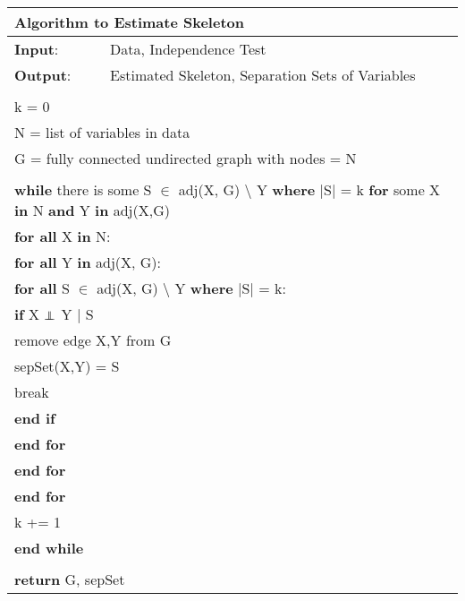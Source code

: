 \documentclass{article}
\newcommand\independent{\protect\mathpalette{\protect\independenT}{\perp}}
\def\independenT#1#2{\mathrel{\rlap{$#1#2$}\mkern2mu{#1#2}}}
\begin{document}
\begin{table}[h!]
	\begin{tabular}{|l l|}
		\hline
		\multicolumn{2}{|l|}{Algorithm to Estimate Skeleton}\\ 
		\hline
		\textbf{Input}: & Data, Independence Test\\
		\textbf{Output}: & Estimated Skeleton, Separation Sets of Variables\\
		&\\
		\multicolumn{2}{|l|}{k = 0}\\
		\multicolumn{2}{|l|}{N = list of variables in data}\\
		\multicolumn{2}{|l|}{G = fully connected undirected graph with nodes = N}\\
		&\\
		\multicolumn{2}{|l|}{\textbf{while} there is some S $\in $ adj(X, G) $\setminus$ Y \textbf{where} $ | $S$ | $ = k \textbf{for} some X \textbf{in} N \textbf{and} Y \textbf{in} adj(X,G)}\\
		\multicolumn{2}{|l|}{\quad\textbf{for all} X \textbf{in} N:}\\
		\multicolumn{2}{|l|}{\quad\quad \textbf{for all} Y \textbf{in} adj(X, G):}\\
		\multicolumn{2}{|l|}{\quad\quad\quad \textbf{for all} S $\in $ adj(X, G) $\setminus$ Y \textbf{where} $ | $S$ | $ = k:}\\
		\multicolumn{2}{|l|}{\quad \quad \quad\quad \textbf{if} X $ \independent $ Y $ | $ S}\\
		\multicolumn{2}{|l|}{\quad \quad \quad \quad\quad remove edge X,Y from G}\\
		\multicolumn{2}{|l|}{\quad \quad \quad \quad\quad sepSet(X,Y) = S}\\
		\multicolumn{2}{|l|}{\quad \quad \quad \quad\quad break}\\
		\multicolumn{2}{|l|}{\quad \quad \quad\quad \textbf{end if}} \\
		\multicolumn{2}{|l|}{\quad \quad\quad \textbf{end for}}\\
		\multicolumn{2}{|l|}{\quad\quad \textbf{end for}}\\
		\multicolumn{2}{|l|}{\quad\textbf{end for}}\\
		\multicolumn{2}{|l|}{\quad k += 1}\\
		\multicolumn{2}{|l|}{ \textbf{end while}}\\
		&\\
		\multicolumn{2}{|l|}{ \textbf{return} G, sepSet}\\
		\hline
		
	\end{tabular}
\end{table}
\end{document}
